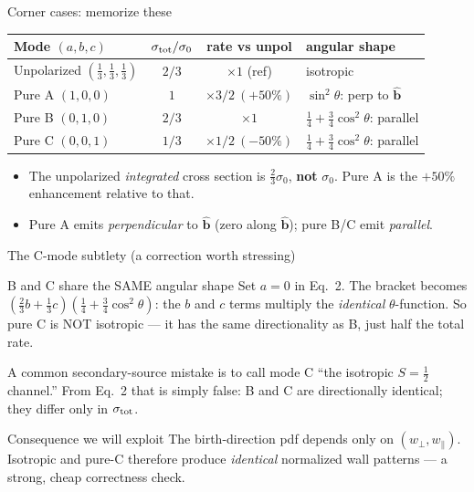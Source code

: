 \documentclass[aspectratio=169]{beamer}
\newcommand{\bb}{\hat{\bm b}}
\newcommand{\sigo}{\sigma_0}
\newcommand{\wperp}{w_\perp}
\newcommand{\wpar}{w_\parallel}
\begin{document}
\begin{frame}[t]{Corner cases: memorize these}
\renewcommand{\arraystretch}{1.15}
\begin{center}
\begin{tabular}{lccl}
\toprule
Mode $(a,b,c)$ & $\sigma_{\rm tot}/\sigo$ & rate vs unpol & angular shape \\
\midrule
Unpolarized $(\tfrac13,\tfrac13,\tfrac13)$ & $2/3$ & $\times 1$ (ref) & isotropic \\
Pure A $(1,0,0)$ & $1$ & $\times 3/2\ (+50\%)$ & $\sin^2\theta$: \alert{perp} to $\bb$ \\
Pure B $(0,1,0)$ & $2/3$ & $\times 1$ & $\tfrac14+\tfrac34\cos^2\theta$: \alert{parallel} \\
Pure C $(0,0,1)$ & $1/3$ & $\times 1/2\ (-50\%)$ & $\tfrac14+\tfrac34\cos^2\theta$: \alert{parallel} \\
\bottomrule
\end{tabular}
\end{center}
\vspace{0.5em}
\begin{itemize}
  \item The unpolarized \emph{integrated} cross section is $\tfrac23\sigo$, \textbf{not} $\sigo$. Pure A is the $+50\%$ enhancement relative to that.
  \item Pure A emits \emph{perpendicular} to $\bb$ (zero along $\bb$); pure B/C emit \emph{parallel}.
\end{itemize}
\end{frame}

\begin{frame}[t]{The C-mode subtlety (a correction worth stressing)}
\begin{block}{B and C share the SAME angular shape}
Set $a=0$ in Eq.~2. The bracket becomes $(\tfrac23 b + \tfrac13 c)(\tfrac14+\tfrac34\cos^2\theta)$: the $b$ and $c$ terms multiply the \emph{identical} $\theta$-function. So pure C is \alert{NOT isotropic} --- it has the same directionality as B, just half the total rate.
\end{block}
\vspace{0.3em}
A common secondary-source mistake is to call mode C ``the isotropic $S=\tfrac12$ channel.'' From Eq.~2 that is simply false: B and C are directionally identical; they differ only in $\sigma_{\rm tot}$.
\begin{block}{Consequence we will exploit}
The birth-direction pdf depends only on $(\wperp,\wpar)$. Isotropic and pure-C therefore produce \emph{identical} normalized wall patterns --- a strong, cheap correctness check.
\end{block}
\end{frame}
\end{document}
